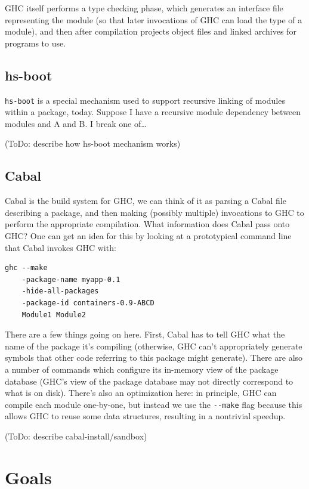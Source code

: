 \documentclass{article}
\begin{document}
GHC itself performs a type checking phase, which generates an interface
file representing the module (so that later invocations of GHC can load the type
of a module), and then after compilation projects object files and linked archives
for programs to use.

\subsection{hs-boot}

\verb|hs-boot| is a special mechanism used to support recursive linking
of modules within a package, today.  Suppose I have a recursive module
dependency between modules and A and B. I break one of\ldots

(ToDo: describe how hs-boot mechanism works)

\subsection{Cabal}

Cabal is the build system for GHC, we can think of it as parsing a Cabal
file describing a package, and then making (possibly multiple)
invocations to GHC to perform the appropriate compilation.  What
information does Cabal pass onto GHC\@?  One can get an idea for this by
looking at a prototypical command line that Cabal invokes GHC with:

\begin{verbatim}
ghc --make
    -package-name myapp-0.1
    -hide-all-packages
    -package-id containers-0.9-ABCD
    Module1 Module2
\end{verbatim}

There are a few things going on here.  First, Cabal has to tell GHC
what the name of the package it's compiling (otherwise, GHC can't appropriately
generate symbols that other code referring to this package might generate).
There are also a number of commands which configure its in-memory view of
the package database (GHC's view of the package database may not directly
correspond to what is on disk).  There's also an optimization here: in principle,
GHC can compile each module one-by-one, but instead we use the \verb|--make| flag
because this allows GHC to reuse some data structures, resulting in a nontrivial
speedup.

(ToDo: describe cabal-install/sandbox)

\section{Goals}
\end{document}
